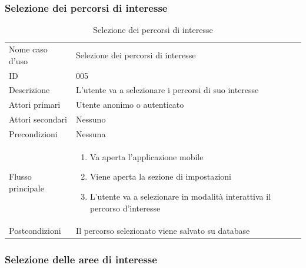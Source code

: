 \documentclass{article}
\begin{document}
\subsubsection{Selezione dei percorsi di interesse}

\begin{table}[htbp]
    \label{8.2.4}
    \centering
    \begin{tabularx}{\textwidth}{| l | p{} |}
        \Xhline{2pt} %
        Nome caso d'uso & Selezione dei percorsi di interesse \\
        \Xhline{2pt} %
        ID & 005 \\
        \hline
        Descrizione & L'utente va a selezionare i percorsi di suo interesse\\
        \hline
        Attori primari & Utente anonimo o autenticato\\
        \hline
        Attori secondari & Nessuno \\
        \hline
        Precondizioni & Nessuna \\
        \hline
        Flusso principale & 
        \begin{enumerate}[topsep=5pt,partopsep=0pt,parsep=0pt,itemsep=0pt,before=\vspace{-\baselineskip},after=\vspace{-\baselineskip}]                
            \item Va aperta l'applicazione mobile
            \item Viene aperta la sezione di impostazioni
            \item L'utente va a selezionare in modalità interattiva il percorso d'interesse
        \end{enumerate}
        \\
        \hline
        Postcondizioni & Il percorso selezionato viene salvato su database \\
        \hline
    \end{tabularx}
    \caption{Selezione dei percorsi di interesse}
    \label{tab:tabella_use_case004}
\end{table}

\clearpage

\subsubsection{Selezione delle aree di interesse}
\end{document}

